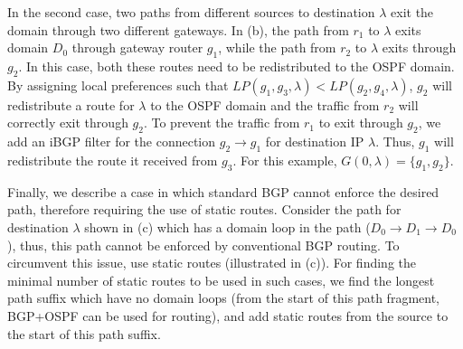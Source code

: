 In the second case, two paths from different sources to
destination $\lambda$ exit
the domain through two different
gateways. In (b),
the path from $r_1$ to $\lambda$ exits domain $D_0$ through 
gateway router $g_1$, while the path from $r_2$  to $\lambda$ exits 
through $g_2$. 
In this case, both these routes need to be  
redistributed to the OSPF domain. 
By assigning local preferences such that
$LP(g_1,g_3,\lambda)<LP(g_2,g_4,\lambda)$,
 $g_2$ will redistribute a route for $\lambda$ 
 to the OSPF domain and
the traffic from $r_2$ will correctly exit through $g_2$. 
To prevent the traffic from $r_1$ to exit through $g_2$,
we add an iBGP filter
 for the connection $g_2 \rightarrow g_1$ for
destination IP $\lambda$. 
Thus, $g_1$ will 
redistribute the route it received from $g_3$. For 
this example, $G(0, \lambda) = \{g_1, g_2\}$. 

Finally, we describe a case in which standard BGP cannot enforce
the desired path, therefore requiring the use of static routes.
Consider the path for destination $\lambda$ 
shown in (c) which has a domain loop in the path
($D_0 \rightarrow D_1 \rightarrow D_0$), thus, this path cannot be
enforced by conventional BGP routing.
To circumvent this issue, \name use static routes 
(illustrated in (c)). 
For finding the minimal number of static routes to be used in
such cases, we find the longest path suffix which have
no domain loops (from the start of this path fragment, 
BGP+OSPF can be used for routing), 
and add static routes from the source to the start of this path suffix.
 



